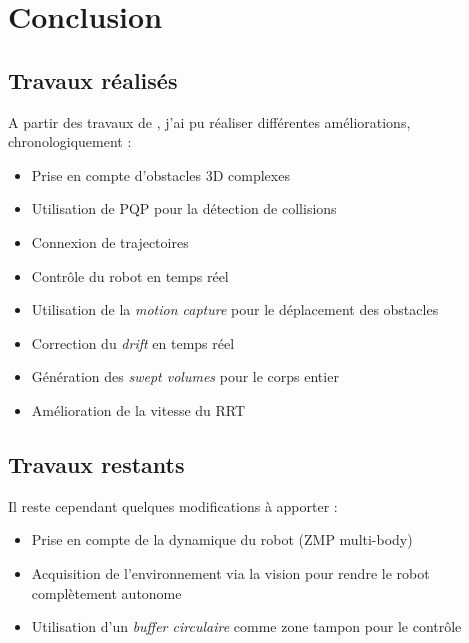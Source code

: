 \newpage
\section{Conclusion}
\label{sec:conlusion}

\subsection{Travaux réalisés}
\label{sub:travauxrealises}
A partir des travaux de \nicolas, j'ai pu réaliser différentes améliorations, chronologiquement :
\begin{itemize}
\item Prise en compte d'obstacles 3D complexes
\item Utilisation de PQP pour la détection de collisions
\item Connexion de trajectoires
\item Contrôle du robot en temps réel
\item Utilisation de la \emph{motion capture} pour le déplacement des obstacles
\item Correction du \emph{drift} en temps réel
\item Génération des \emph{swept volumes} pour le corps entier
\item Amélioration de la vitesse du RRT
\end{itemize}

\subsection{Travaux restants}
\label{sub:travauxrestant}

Il reste cependant quelques modifications à apporter :
\begin{itemize}
\item Prise en compte de la dynamique du robot (ZMP multi-body)
\item Acquisition de l'environnement via la vision pour rendre le robot complètement autonome
\item Utilisation d'un \emph{buffer circulaire} comme zone tampon pour le contrôle
\end{itemize}


